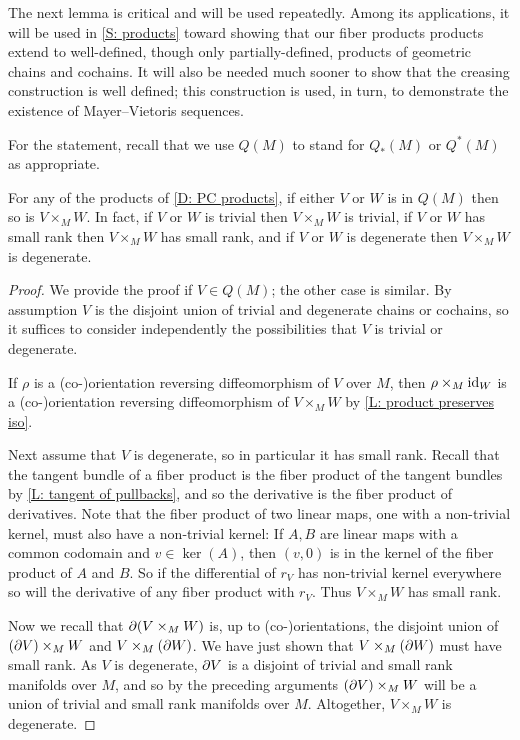 The next lemma is critical and will be used repeatedly.
Among its applications, it will be used in \cref{S: products} toward showing that our fiber products products extend to well-defined, though only partially-defined, products of geometric chains and cochains.
It will also be needed much sooner to show that the creasing construction is well defined; this construction is used, in turn, to demonstrate the existence of Mayer--Vietoris sequences.

For the statement, recall that we use $Q(M)$ to stand for $Q_*(M)$ or $Q^*(M)$ as appropriate.

\begin{lemma}\label{L: pullback with Q}
	For any of the products of \cref{D: PC products}, if either $V$ or $W$ is in $Q(M)$ then so is $V \times_M W$.
	In fact, if $V$ or $W$ is trivial then $V \times_M W$ is trivial, if $V$ or $W$ has small rank then $V \times_M W$ has small rank, and if $V$ or $W$ is degenerate then $V \times_M W$ is degenerate.
\end{lemma}

\begin{proof}
	We provide the proof if $V \in Q(M)$; the other case is similar.
	By assumption $V$ is the disjoint union of trivial and degenerate chains or cochains, so it suffices to consider independently the possibilities that $V$ is trivial or degenerate.

	If $\rho$ is a (co\nobreakdash-)orientation reversing diffeomorphism of $V$ over $M$, then $\rho \times_M \mathrm{id}_W$ is a (co\nobreakdash-)orientation reversing diffeomorphism of $V \times_M W$ by \cref{L: product preserves iso}.

	Next assume that $V$ is degenerate, so in particular it has small rank.
	Recall that the tangent bundle of a fiber product is the fiber product of the tangent bundles by \cref{L: tangent of pullbacks}, and so the derivative is the fiber product of derivatives.
	Note that the fiber product of two linear maps, one with a non-trivial kernel, must also have a non-trivial kernel: If $A,B$ are linear maps with a common codomain and $v \in \ker(A)$, then $(v,0)$ is in the kernel of the fiber product of $A$ and $B$.
	So if the differential of $r_V$ has non-trivial kernel everywhere so will the derivative of any fiber product with $r_V$.
	Thus $V \times_M W$ has small rank.

	Now we recall that $\partial(V \times_M W)$ is, up to (co\nobreakdash-)orientations, the disjoint union of $(\partial V) \times_M W$ and $V \times_M (\partial W)$.
	We have just shown that $V \times_M (\partial W)$ must have small rank.
	As $V$ is degenerate, $\partial V$ is a disjoint of trivial and small rank manifolds over $M$, and so by the preceding arguments $(\partial V) \times_M W$ will be a union of trivial and small rank manifolds over $M$.
	Altogether, $V \times_M W$ is degenerate.
\end{proof}

